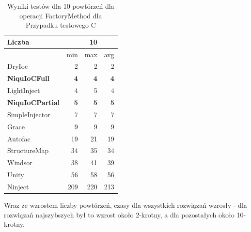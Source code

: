 \documentclass[12pt]{article}
\begin{document}
\begin{table}[H]
\captionsetup{belowskip=0pt,aboveskip=0pt}
\begin{center}
\begin{small}
	\begin{tabular}{ | l | r r r | }
    		\hline
Liczba & & 10 & \\ \hline
 & min & max & avg \\ \hline
DryIoc & 2 & 2 & 2 \\ \hline
\textbf{NiquIoCFull} & \textbf{4} & \textbf{4} & \textbf{4} \\ \hline
LightInject & 4 & 5 & 4 \\ \hline
\textbf{NiquIoCPartial} & \textbf{5} & \textbf{5} & \textbf{5} \\ \hline
SimpleInjector & 7 & 7 & 7 \\ \hline
Grace & 9 & 9 & 9 \\ \hline
Autofac & 19 & 21 & 19 \\ \hline
StructureMap & 34 & 35 & 34 \\ \hline
Windsor & 38 & 41 & 39 \\ \hline
Unity & 56 & 58 & 56 \\ \hline
Ninject & 209 & 220 & 213 \\ \hline
  	\end{tabular}
\end{small}
\end{center}
\caption{Wyniki testów dla 10 powtórzeń dla operacji FactoryMethod dla Przypadku testowego C}
\label{TestCaseC_FactoryMethod10}
\end{table}
Wraz ze wzrostem liczby powtórzeń, czasy dla wszystkich rozwiązań wzrosły - dla rozwiązań najszybszych był to wzrost około 2-krotny, a dla pozostałych około 10-krotny.
\\ \\
\end{document}
